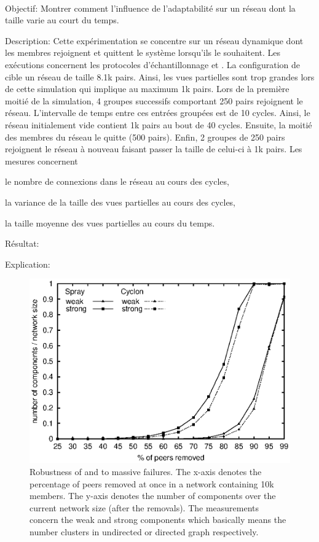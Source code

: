 \ \\

\begin{asparadesc}
\item [Objectif:] Montrer comment l'influence de l'adaptabilité sur un réseau
  dont la taille varie au court du temps.
\item [Description:] Cette expérimentation se concentre sur un réseau dynamique
  dont les membres rejoignent et quittent le système lorsqu'ils le
  souhaitent. Les exécutions concernent les protocoles d'échantillonnage \CYCLON
  et \SPRAY. La configuration de \CYCLON cible un réseau de taille 8.1k
  pairs. Ainsi, les vues partielles sont trop grandes lors de cette simulation
  qui implique au maximum 1k pairs. Lors de la première moitié de la simulation,
  4 groupes successifs comportant 250 pairs rejoignent le réseau. L'intervalle
  de temps entre ces entrées groupées est de 10 cycles. Ainsi, le réseau
  initialement vide contient 1k pairs au bout de 40 cycles. Ensuite, la moitié
  des membres du réseau le quitte (500 pairs). Enfin, 2 groupes de 250 pairs
  rejoignent le réseau à nouveau faisant passer la taille de celui-ci à 1k
  pairs. Les mesures concernent
  \begin{inparaenum}[(i)]
  \item le nombre de connexions dans le réseau au cours des cycles,
  \item la variance de la taille des vues partielles au cours des cycles,
  \item la taille moyenne des vues partielles au cours du temps.
  \end{inparaenum}
\item [Résultat:]
\item [Explication:]
\end{asparadesc}


\begin{figure}
  \centering
  \includegraphics[width=.8\textwidth]{img/spray/resilience.eps}
  \caption{\label{fig:resilience}Robustness of \CYCLON and \SPRAY to massive
    failures. The x-axis denotes the percentage of peers removed at once in a
    network containing 10k members. The y-axis denotes the number of
    components over the current network size (after the removals). The
    measurements concern the weak and strong components which basically means
    the number clusters in undirected or directed graph respectively.}
\end{figure}


